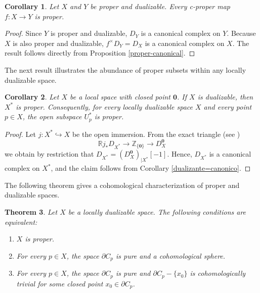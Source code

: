 \documentclass[amssymb,amscd,11pt,20pt]{amsart}
\newcommand{\ZZ}{{\mathbb Z}}
\newcommand{\RR}{\mathbb R}
\newcommand{\0}{\mathbf 0}
\theoremstyle{plain}
\newtheorem{thm}{Theorem}[section]
\newtheorem{cor}[thm]{Corollary}
\numberwithin{equation}{thm}
\begin{document}
\begin{cor}\label{c-proper=proper} Let $X$ and $Y$ be proper and dualizable. Every c-proper map $f\colon X\to Y$ is proper.
\end{cor}
\begin{proof} Since $Y$ is proper and dualizable, $D_Y$ is a canonical complex on $Y$.  Because $X$ is also proper and dualizable, $f^\times D_Y=D_X$ is a canonical complex on $X$. The result follows directly from Proposition \ref{proper-canonical}.
\end{proof}

The next result illustrates  the abundance of proper subsets within any locally dualizable space.

\begin{cor}\label{abundance} Let $X$ be a local space  with closed point $\0$. If $X$ is dualizable, then $X^*$ is proper. Consequently, for every locally dualizable space $X$ and every point $p\in X$, the open subspace $U_p^*$ is proper.
\end{cor}



\begin{proof} Let $j\colon X^*\hookrightarrow X$ be the open immersion. From the exact triangle (see \cite[(3.6.2)]{ST2})
\[ \RR j_*D_{X^*}\to\ZZ_{\{\0\}}\to D_X^\0\] we obtain by restriction that $D_{X^*}= (D_X^\0)_{\vert X^*}[-1].$ Hence, $D_{X^*}$ is a canonical complex on $X^*$, and the claim follows from Corollary \ref{dualizante=canonico}.
\end{proof}

The following theorem gives a cohomological characterization of proper and dualizable spaces.

\begin{thm}\label{proper+dualizable} Let $X$ be a locally dualizable space. The following conditions are equivalent:
\begin{enumerate}
\item $X$ is proper.
\item For every $p\in X$,  the space  $\partial C_p$ is pure and  a cohomological sphere.
\item For every $p\in X$, the space $\partial C_p $ is pure and $\partial C_p-\{x_0\}$ is cohomologically trivial for some closed point $x_0\in\partial C_p$.
\end{enumerate}
\end{thm}
\end{document}
